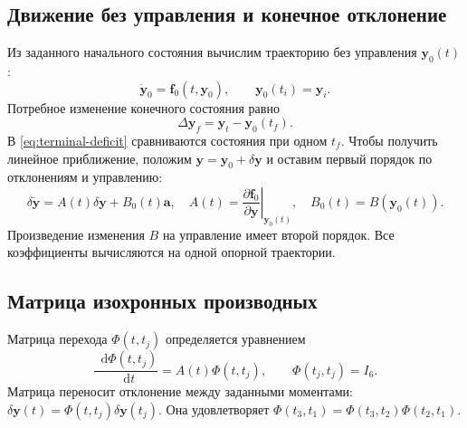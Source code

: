 \documentclass[a4paper,11pt]{article}
\newcommand{\dd}{\mathop{}\!\mathrm d}
\numberwithin{equation}{section}
\theoremstyle{remark}
\newcommand{\vect}[1]{\boldsymbol{#1}}
\begin{document}
\subsection{Движение без управления и конечное отклонение}

Из заданного начального состояния вычислим траекторию без
управления $\vect y_0(t)$:
\begin{equation}
 \dot{\vect y}_0=\vect f_0(t,\vect y_0),\qquad
 \vect y_0(t_i)=\vect y_i.
 \label{eq:reference}
\end{equation}
Потребное изменение конечного
состояния равно
\begin{equation}
 \Delta\vect y_f=\vect y_t-\vect y_0(t_f).
 \label{eq:terminal-deficit}
\end{equation}
В \eqref{eq:terminal-deficit} сравниваются состояния при одном $t_f$.
Чтобы получить линейное приближение, положим
$\vect y=\vect y_0+\delta\vect y$ и оставим первый порядок
по отклонениям и управлению:
\begin{equation}
 \delta\dot{\vect y}=A(t)\delta\vect y+B_0(t)\vect a,
 \quad
 A(t)=\left.\frac{\partial\vect f_0}{\partial\vect y}\right|_{\vect y_0(t)},
 \quad B_0(t)=B(\vect y_0(t)).
 \label{eq:variation}
\end{equation}
Произведение изменения $B$ на управление имеет второй порядок.
Все коэффициенты вычисляются на одной опорной траектории.

\subsection{Матрица изохронных производных}

Матрица перехода $\Phi(t,t_j)$ определяется уравнением
\begin{equation}
 \frac{\dd\Phi(t,t_j)}{\dd t}=A(t)\Phi(t,t_j),
 \qquad \Phi(t_j,t_j)=I_6.
 \label{eq:stm-definition}
\end{equation}
Матрица переносит отклонение между заданными моментами:
$\delta\vect y(t)=\Phi(t,t_j)\delta\vect y(t_j)$.
Она удовлетворяет $\Phi(t_3,t_1)=\Phi(t_3,t_2)\Phi(t_2,t_1)$.
\end{document}
